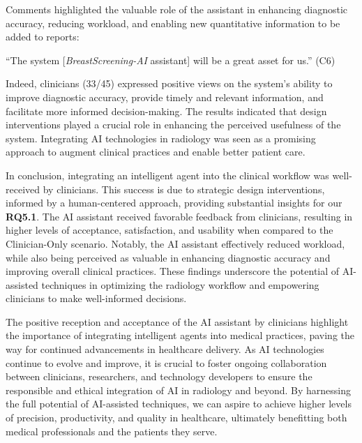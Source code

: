 \vspace{2.50mm}

\noindent
Comments highlighted the valuable role of the assistant in enhancing diagnostic accuracy, reducing workload, and enabling new quantitative information to be added to reports:

\vspace{2.50mm}

\noindent
``The system [{\it BreastScreening-AI} assistant] will be a great asset for us.'' (C6)

\vspace{2.50mm}


Indeed, clinicians (33/45) expressed positive views on the system's ability to improve diagnostic accuracy, provide timely and relevant information, and facilitate more informed decision-making.
The results indicated that design interventions played a crucial role in enhancing the perceived usefulness of the system.
Integrating \ac{AI} technologies in radiology was seen as a promising approach to augment clinical practices and enable better patient care.

In conclusion, integrating an intelligent agent into the clinical workflow was well-received by clinicians.
This success is due to strategic design interventions, informed by a human-centered approach, providing substantial insights for our {\bf RQ5.1}.
The \ac{AI} assistant received favorable feedback from clinicians, resulting in higher levels of acceptance, satisfaction, and usability when compared to the Clinician-Only scenario.
Notably, the \ac{AI} assistant effectively reduced workload, while also being perceived as valuable in enhancing diagnostic accuracy and improving overall clinical practices.
These findings underscore the potential of \ac{AI}-assisted techniques in optimizing the radiology workflow and empowering clinicians to make well-informed decisions.

The positive reception and acceptance of the \ac{AI} assistant by clinicians highlight the importance of integrating intelligent agents into medical practices, paving the way for continued advancements in healthcare delivery.
As \ac{AI} technologies continue to evolve and improve, it is crucial to foster ongoing collaboration between clinicians, researchers, and technology developers to ensure the responsible and ethical integration of \ac{AI} in radiology and beyond.
By harnessing the full potential of \ac{AI}-assisted techniques, we can aspire to achieve higher levels of precision, productivity, and quality in healthcare, ultimately benefitting both medical professionals and the patients they serve.

